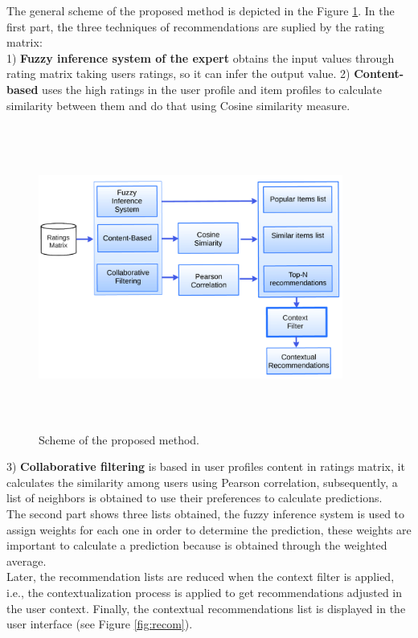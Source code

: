 The general scheme of the proposed method is depicted in the 
Figure  \ref{fig:archit}. In the first part, the three techniques of
recommendations are suplied by the rating matrix: \\ 
1) \textbf{Fuzzy inference system of the expert}  obtains the input 
values  through rating matrix taking users ratings, so it can infer 
the output value.
2) \textbf{Content-based} uses the high ratings in the user profile and item
profiles to calculate similarity between them and do that using Cosine
similarity measure.
\begin{figure}
\captionsetup{font=footnotesize}
\centering 
\includegraphics[width=10cm,height=10cm,keepaspectratio]{img/archit.png}
\caption{Scheme of the proposed method.}
\label{fig:archit}  
\end{figure}
3) \textbf{Collaborative filtering} is based in user profiles content in
ratings matrix, it calculates the similarity among  users using
Pearson correlation, subsequently,  a list of neighbors is obtained to
use their preferences to calculate predictions.\\
The second part shows three lists obtained, the fuzzy inference system
is used to assign weights for each one in order to determine the
prediction, these weights are important to calculate a
prediction because is obtained through the weighted average.\\
Later, the recommendation lists are reduced when the context filter is
applied, i.e., the contextualization process is applied to get
recommendations adjusted in the user context. 
Finally, the contextual recommendations list is displayed in the 
user interface (see Figure  \ref{fig:recom}).

